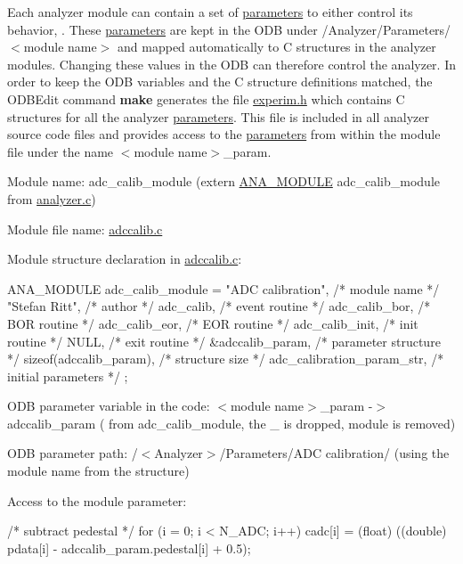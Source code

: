 Each analyzer module can contain a set of \hyperlink{structparameters}{parameters} to either control its behavior, . These \hyperlink{structparameters}{parameters} are kept in the ODB under /Analyzer/Parameters/$<$module name$>$ and mapped automatically to C structures in the analyzer modules. Changing these values in the ODB can therefore control the analyzer. In order to keep the ODB variables and the C structure definitions matched, the ODBEdit command {\bfseries make} generates the file \hyperlink{experim_8h}{experim.h} which contains C structures for all the analyzer \hyperlink{structparameters}{parameters}. This file is included in all analyzer source code files and provides access to the \hyperlink{structparameters}{parameters} from within the module file under the name $<$module name$>$\_\-param.
\begin{DoxyItemize}
\item Module name: adc\_\-calib\_\-module (extern \hyperlink{structANA__MODULE}{ANA\_\-MODULE} adc\_\-calib\_\-module from \hyperlink{analyzer_8c}{analyzer.c})
\item Module file name: \hyperlink{adccalib_8c}{adccalib.c}
\item Module structure declaration in \hyperlink{adccalib_8c}{adccalib.c}: 
\begin{DoxyCode}
ANA_MODULE adc_calib_module = {
   "ADC calibration",           /* module name           */
   "Stefan Ritt",               /* author                */
   adc_calib,                   /* event routine         */
   adc_calib_bor,               /* BOR routine           */
   adc_calib_eor,               /* EOR routine           */
   adc_calib_init,              /* init routine          */
   NULL,                        /* exit routine          */
   &adccalib_param,             /* parameter structure   */
   sizeof(adccalib_param),      /* structure size        */
   adc_calibration_param_str,   /* initial parameters    */
};
\end{DoxyCode}

\begin{DoxyItemize}
\item ODB parameter variable in the code: $<$module name$>$\_\-param -\/$>$ adccalib\_\-param ( from adc\_\-calib\_\-module, the \_\- is dropped, module is removed)
\item ODB parameter path: /$<$Analyzer$>$/Parameters/ADC calibration/ (using the module name from the structure)
\item Access to the module parameter: 
\begin{DoxyCode}
     /* subtract pedestal */
    for (i = 0; i < N_ADC; i++)
       cadc[i] = (float) ((double) pdata[i] - adccalib_param.pedestal[i] + 0.5);
\end{DoxyCode}


\end{DoxyItemize}
\end{DoxyItemize}
